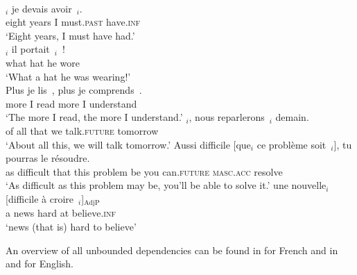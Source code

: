 \eal 
\ex\citep[306]{Abeille.2008.NP-preposing} \\ \nopagebreak
{}$_i$ je devais avoir~\trace{}$_i$.\\
eight years I must\textsc{.past} have\textsc{.inf}\\
\glt `Eight years, I must have had.'
\label{ex:complement-fronting}
\ex \citep[438]{Marandin.2008}\\
$_i$ il portait~\trace{}$_i$~!\\ 
what hat he wore\\ 
\glt `What a hat he was wearing!'
\label{ex:exclamative}
\ex\citep[1148]{Abeille.2008.Comparative-correlatives} \\
\gll Plus je lis~\trace{}, plus je comprends~\trace{}.\\ 
more I read more I understand\\ 
\glt `The more I read, the more I understand.'
\label{ex:comparative}
\ex{}$_i$, nous reparlerons~\trace{}$_i$ demain.\\ 
of all that we talk\textsc{.future} tomorrow\\ 
\glt `About all this, we will talk tomorrow.'
\label{ex:topicalization}
\ex\gll Aussi difficile [que$_i$ ce problème soit~\trace{}$_i$], tu pourras le résoudre.\\ 
as difficult that this problem be you can\textsc{.future} \textsc{masc.acc} resolve\\ 
\glt `As difficult as this problem may be, you'll be able to solve it.'
\label{ex:concessive}
\ex\gll une nouvelle$_i$ [difficile à croire~\trace{}$_i$]$_{\text{AdjP}}$\\ 
a news hard at believe\textsc{.inf}\\ 
\glt `news (that is) hard to believe'
\label{ex:tough-cx-fr}
\zl 


An overview of all unbounded dependencies can be found in \citet[Section~1.2.2]{Godard.1988} for French and in \citet[Chapter~2]{Sag.2010} and \citet[Chapter~2]{Chaves.2020.UDC} for English.


